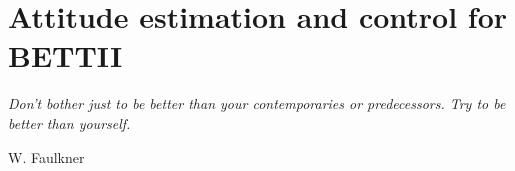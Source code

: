 
\chapter[Attitude estimation and control for BETTII]{Attitude estimation and control for BETTII} %

\label{chap:controls} %

\epigraph{\small\itshape Don't bother just to be better than your contemporaries or predecessors. Try to be better than yourself.}{W. Faulkner}



\usetikzlibrary{decorations.markings}

\renewcommand*{\arraystretch}{0.75}

%





%






